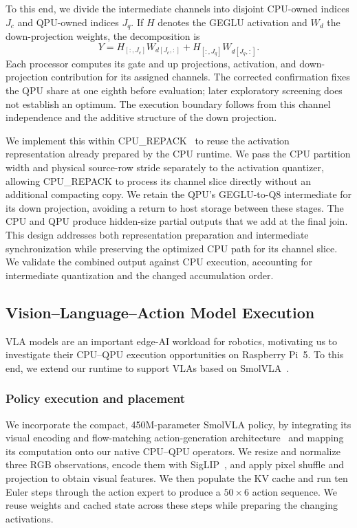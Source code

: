 \documentclass[sigplan,screen,review]{acmart}
\begin{document}
To this end, we divide the intermediate channels into disjoint CPU-owned indices $J_c$ and QPU-owned indices $J_q$. If $H$ denotes the GEGLU activation and $W_d$ the down-projection weights, the decomposition is
\begin{equation}
Y =
H_{[:,J_c]}W_{d[J_c,:]}
+
H_{[:,J_q]}W_{d[J_q,:]}.
\end{equation}
Each processor computes its gate and up projections, activation, and down-projection contribution for its assigned channels. The corrected confirmation fixes the QPU share at one eighth before evaluation; later exploratory screening does not establish an optimum. The execution boundary follows from this channel independence and the additive structure of the down projection.

We implement this within CPU\_REPACK~\cite{llamacpp} to reuse the activation representation already prepared by the CPU runtime. We pass the CPU partition width and physical source-row stride separately to the activation quantizer, allowing CPU\_REPACK to process its channel slice directly without an additional compacting copy. We retain the QPU's GEGLU-to-Q8 intermediate for its down projection, avoiding a return to host storage between these stages. The CPU and QPU produce hidden-size partial outputs that we add at the final join. This design addresses both representation preparation and intermediate synchronization while preserving the optimized CPU path for its channel slice. We validate the combined output against CPU execution, accounting for intermediate quantization and the changed accumulation order.


\subsection{Vision--Language--Action Model Execution}
\label{sec:vla}

VLA models are an important edge-AI workload for robotics, motivating us to investigate their CPU--QPU execution opportunities on Raspberry Pi~5. To this end, we extend our runtime to support VLAs based on SmolVLA~\cite{smolvla}. 

\subsubsection{Policy execution and placement} 

We incorporate the compact, 450M-parameter SmolVLA policy, by integrating its visual encoding and flow-matching action-generation architecture~\cite{smolvla} and mapping its computation onto our native CPU--QPU operators. We resize and normalize three RGB observations, encode them with SigLIP~\cite{siglip}, and apply pixel shuffle and projection to obtain visual features. We then populate the KV cache and run ten Euler steps through the action expert to produce a $50\times6$ action sequence. We reuse weights and cached state across these steps while preparing the changing activations.
\end{document}
